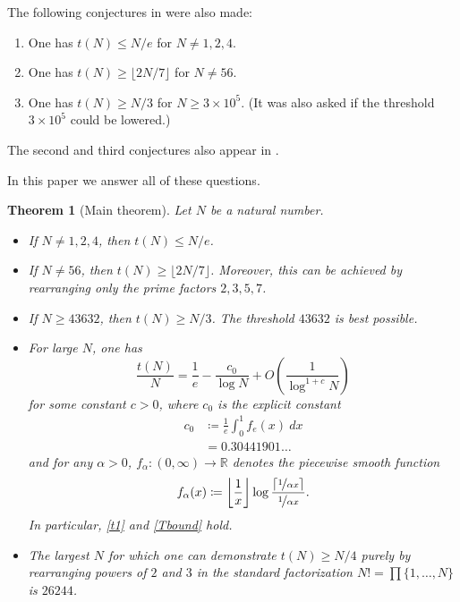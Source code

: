 \documentclass[10pt,a4paper,reqno]{amsart}
\numberwithin{equation}{section}
\theoremstyle{plain}
\newtheorem{theorem}{Theorem}[section]
\theoremstyle{definition}
\newcommand\R{\mathbb{R}}
\begin{document}
The following conjectures in \cite{guy-selfridge} were also made:
\begin{enumerate}
\item One has $t(N) \leq N/e$ for $N \neq 1,2,4$.
\item One has $t(N) \geq \lfloor 2N/7 \rfloor$ for $N \neq 56$.
\item One has $t(N) \geq N/3$ for $N \geq 3 \times 10^5$.  (It was also asked if the threshold $3 \times 10^5$ could be lowered.)
\end{enumerate}
The second and third conjectures also appear in \cite{guy}.

In this paper we answer all of these questions.

\begin{theorem}[Main theorem]\label{main} Let $N$ be a natural number.
\begin{itemize}
\item[(i)] If $N \neq 1,2,4$, then $t(N) \leq N/e$.
\item[(ii)]  If $N \neq 56$, then $t(N) \geq \lfloor 2N/7 \rfloor$.  Moreover, this can be achieved by rearranging only the prime factors $2,3,5,7$.
\item[(iii)]  If $N \geq 43632$, then $t(N) \geq N/3$.  The threshold $43632$ is best possible.
\item[(iv)]  For large $N$, one has
  \begin{equation}\label{asym}
    \frac{t(N)}{N} = \frac{1}{e} - \frac{c_0}{\log N} + O\left( \frac{1}{\log^{1+c} N} \right)
  \end{equation}
for some constant $c>0$, where $c_0$ is the explicit constant
\begin{equation}\label{c0-def}
  \begin{split}
  c_0 &\coloneqq \frac{1}{e} \int_0^1 f_e(x)\ dx \\
  &= 0.30441901\dots
\end{split}
\end{equation}
and for any $\alpha>0$, $f_\alpha \colon (0,\infty) \to \R$ denotes the piecewise smooth function
\begin{equation}\label{falpha-def}
  f_\alpha(x) \coloneqq \left\lfloor \frac{1}{x} \right\rfloor \log \frac{\lceil \nicefrac{1}{\alpha x} \rceil}{\nicefrac{1}{\alpha x}}.
\end{equation}
In particular, \eqref{t1} and \eqref{Tbound} hold.
\item[(v)]  The largest $N$ for which one can demonstrate $t(N) \geq N/4$ purely by rearranging powers of $2$ and $3$ in the standard factorization $N! = \prod \{1,\dots,N\}$ is $26244$.
\end{itemize}
\end{theorem}
\end{document}
